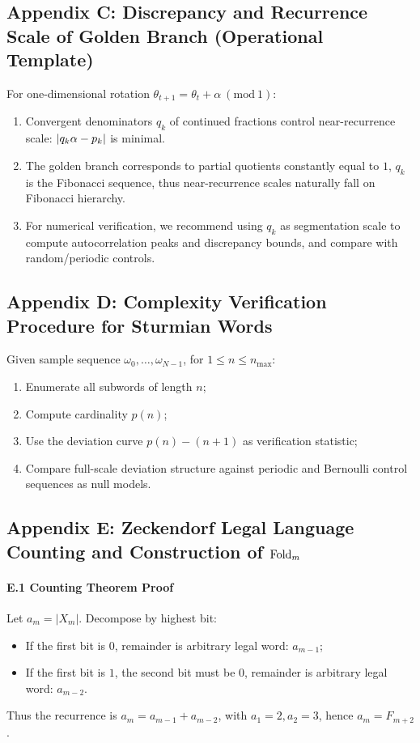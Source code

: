 \subsection{Appendix C: Discrepancy and Recurrence Scale of Golden Branch (Operational Template)}
\label{app:golden-branch}

For one-dimensional rotation $\theta_{t+1}=\theta_t+\alpha\ (\mathrm{mod}\ 1)$:
\begin{enumerate}
  \item Convergent denominators $q_k$ of continued fractions control near-recurrence scale: $\left\lvert q_k\alpha-p_k\right\rvert$ is minimal.
  \item The golden branch corresponds to partial quotients constantly equal to $1$, $q_k$ is the Fibonacci sequence, thus near-recurrence scales naturally fall on Fibonacci hierarchy.
  \item For numerical verification, we recommend using $q_k$ as segmentation scale to compute autocorrelation peaks and discrepancy bounds, and compare with random/periodic controls.
\end{enumerate}

\subsection{Appendix D: Complexity Verification Procedure for Sturmian Words}
\label{app:sturmian-test}

Given sample sequence $\omega_0,\dots,\omega_{N-1}$, for $1\le n\le n_{\max}$:
\begin{enumerate}
  \item Enumerate all subwords of length $n$;
  \item Compute cardinality $p(n)$;
  \item Use the deviation curve $p(n)-(n+1)$ as verification statistic;
  \item Compare full-scale deviation structure against periodic and Bernoulli control sequences as null models.
\end{enumerate}

\subsection{Appendix E: Zeckendorf Legal Language Counting and Construction of \texorpdfstring{$\mathrm{Fold}_m$}{Fold\_m}}
\label{app:zeckendorf-fold}

\paragraph{E.1 Counting Theorem Proof}
Let $a_m=|X_m|$. Decompose by highest bit:
\begin{itemize}
  \item If the first bit is $0$, remainder is arbitrary legal word: $a_{m-1}$;
  \item If the first bit is $1$, the second bit must be $0$, remainder is arbitrary legal word: $a_{m-2}$.
\end{itemize}
Thus the recurrence is $a_m=a_{m-1}+a_{m-2}$, with $a_1=2,a_2=3$, hence $a_m=F_{m+2}$.

